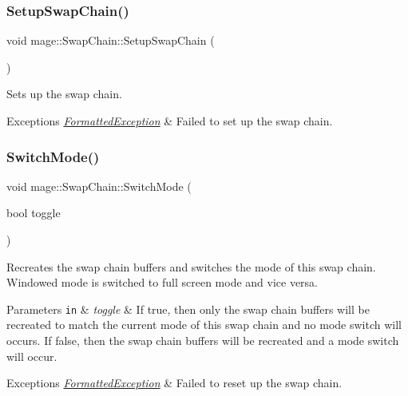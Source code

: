 \subsubsection{\texorpdfstring{Setup\+Swap\+Chain()}{SetupSwapChain()}}
{\footnotesize\ttfamily void mage\+::\+Swap\+Chain\+::\+Setup\+Swap\+Chain (\begin{DoxyParamCaption}{ }\end{DoxyParamCaption})\hspace{0.3cm}{\ttfamily [private]}}

Sets up the swap chain.


\begin{DoxyExceptions}{Exceptions}
{\em \hyperlink{structmage_1_1_formatted_exception}{Formatted\+Exception}} & Failed to set up the swap chain. \\
\hline
\end{DoxyExceptions}
\hypertarget{classmage_1_1_swap_chain_ada1b8857eeac3d00287fb624645e365e}{}\label{classmage_1_1_swap_chain_ada1b8857eeac3d00287fb624645e365e} 
\subsubsection{\texorpdfstring{Switch\+Mode()}{SwitchMode()}}
{\footnotesize\ttfamily void mage\+::\+Swap\+Chain\+::\+Switch\+Mode (\begin{DoxyParamCaption}\item[{bool}]{toggle }\end{DoxyParamCaption})}

Recreates the swap chain buffers and switches the mode of this swap chain. Windowed mode is switched to full screen mode and vice versa.


\begin{DoxyParams}[1]{Parameters}
\mbox{\tt in}  & {\em toggle} & If {\ttfamily true}, then only the swap chain buffers will be recreated to match the current mode of this swap chain and no mode switch will occurs. If {\ttfamily false}, then the swap chain buffers will be recreated and a mode switch will occur. \\
\hline
\end{DoxyParams}

\begin{DoxyExceptions}{Exceptions}
{\em \hyperlink{structmage_1_1_formatted_exception}{Formatted\+Exception}} & Failed to reset up the swap chain. \\
\hline
\end{DoxyExceptions}
\hypertarget{classmage_1_1_swap_chain_a23a4618b5104203c5a5c962696ae3b53}{}\label{classmage_1_1_swap_chain_a23a4618b5104203c5a5c962696ae3b53} 
